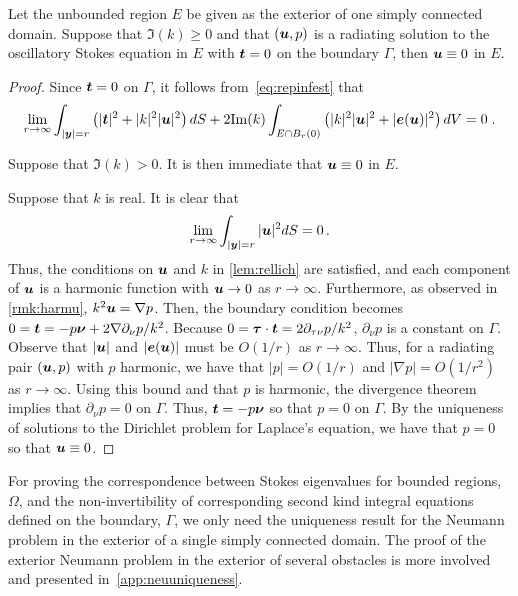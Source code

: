 \begin{thrm}
  Let the unbounded region $E$ be given as the exterior
  of one simply connected domain.
  Suppose that $\Im(k)\geq 0$ and 
  that $({\boldsymbol u},p)$ is a radiating solution to the oscillatory Stokes
  equation in $E$ with ${\boldsymbol t} = 0$ on the boundary $\Gamma$, then
  ${\boldsymbol u} \equiv 0$ in $E$.
\end{thrm}


\begin{proof}
Since ${\boldsymbol t} = 0$ on $\Gamma$, it follows
from~\cref{eq:repinfest} that
\begin{equation}
\lim_{r\to\infty}
\int_{|{\boldsymbol y}|=r} \left( |{\boldsymbol t}|^2 + |k|^2 |{\boldsymbol u}|^2 \right) dS +
2 {\textrm{\textup{Im}}}(k) \int_{E \cap B_{r}(0)} \left(|k|^2 |{\boldsymbol u}|^2 + |{\boldsymbol e}({\boldsymbol u})|^2 \right)
dV = 0 \; . \nonumber
\end{equation}

Suppose that $\Im(k) > 0$. It is then immediate
that ${\boldsymbol u} \equiv 0$ in $E$.

Suppose that $k$ is real. It is clear that
\begin{equation}
\lim_{r\to\infty} \int_{|{\boldsymbol y}|=r} |{\boldsymbol u}|^2 dS = 0 \, . \nonumber
\end{equation}
Thus, the conditions on ${\boldsymbol u}$ and $k$ in \cref{lem:rellich}
are satisfied, and each component of ${\boldsymbol u}$ is a harmonic function
with ${\boldsymbol u} \to 0$ as $r \to \infty$. Furthermore, as observed
in \cref{rmk:harmu}, $k^2 {\boldsymbol u} = \nabla p$. Then, the boundary
condition becomes $0 = {\boldsymbol t} = -p {\boldsymbol \nu} + 2 \nabla \partial_\nu p/k^2$.
Because $0 = {\boldsymbol \tau} \cdot {\boldsymbol t} = 2\partial_{\tau\nu} p/k^2$,
$\partial_\nu p $ is a constant on $\Gamma$.
Observe that $|{\boldsymbol u}|$ and $|{\boldsymbol e}({\boldsymbol u})|$ must be $O(1/r)$ as
$r\to\infty$. Thus,
for a radiating pair $({\boldsymbol u},p)$ with $p$ harmonic,
we have that $|p| = O(1/r)$ and $|\nabla p| = O(1/r^2)$
as $r\to\infty$.
Using this bound and that $p$ is harmonic,
the divergence theorem implies that $\partial_\nu p=0$ on $\Gamma$.
Thus, ${\boldsymbol t} = -p{\boldsymbol \nu}$ so that $p = 0$ on $\Gamma$. By the uniqueness
of solutions to the Dirichlet problem for Laplace's equation,
we have that $p=0$ so that ${\boldsymbol u} \equiv 0$.
\end{proof}

\begin{remark}
For proving the correspondence between Stokes eigenvalues
for bounded regions, $\Omega$, and the non-invertibility
of corresponding second kind integral equations defined on
the boundary, $\Gamma$, we only need the uniqueness result
for the Neumann problem in the exterior of a single
simply connected domain. The proof of the exterior
Neumann problem in the exterior of several
obstacles is more involved and presented
in~\cref{app:neuuniqueness}.
\end{remark}

